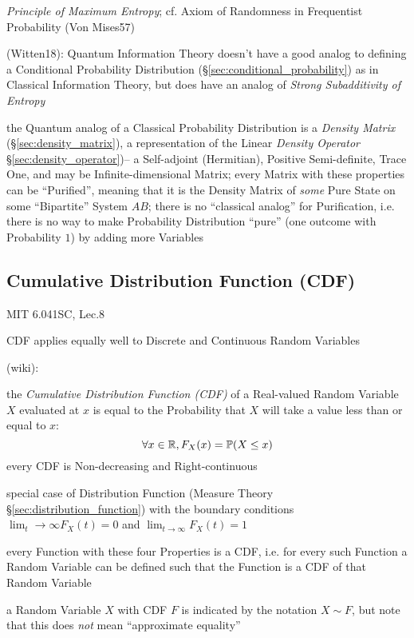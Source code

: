 \emph{Principle of Maximum Entropy}; cf. Axiom of Randomness in Frequentist
Probability (Von Mises57)

(Witten18): Quantum Information Theory doesn't have a good analog to defining a
Conditional Probability Distribution (\S\ref{sec:conditional_probability}) as in
Classical Information Theory, but does have an analog of \emph{Strong
  Subadditivity of Entropy}

the Quantum analog of a Classical Probability Distribution is a \emph{Density
  Matrix} (\S\ref{sec:density_matrix}), a representation of the Linear
\emph{Density Operator} \S\ref{sec:density_operator})-- a Self-adjoint
(Hermitian), Positive Semi-definite, Trace One, and may be Infinite-dimensional
Matrix; every Matrix with these properties can be ``Purified'', meaning that it
is the Density Matrix of \emph{some} Pure State on some ``Bipartite'' System
$AB$; there is no ``classical analog'' for Purification, i.e. there is no way to
make Probability Distribution ``pure'' (one outcome with Probability $1$) by
adding more Variables



\subsection{Cumulative Distribution Function (CDF)}\label{sec:cdf}

MIT 6.041SC, Lec.8

CDF applies equally well to Discrete and Continuous Random Variables

(wiki):

the \emph{Cumulative Distribution Function (CDF)} of a Real-valued Random
Variable $X$ evaluated at $x$ is equal to the Probability that $X$ will take a
value less than or equal to $x$:
\[
  \forall x \in \mathbb{R}, F_X(x) = \mathbb{P}(X \leq x)
\]
every CDF is Non-decreasing and Right-continuous

special case of Distribution Function (Measure Theory
\S\ref{sec:distribution_function}) with the boundary conditions
$\lim_t\to\infty F_X(t) = 0$ and $\lim_{t\to\infty}F_X(t) = 1$

every Function with these four Properties is a CDF, i.e. for every such Function
a Random Variable can be defined such that the Function is a CDF of that Random
Variable

a Random Variable $X$ with CDF $F$ is indicated by the notation $X \sim F$, but
note that this does \emph{not} mean ``approximate equality''

